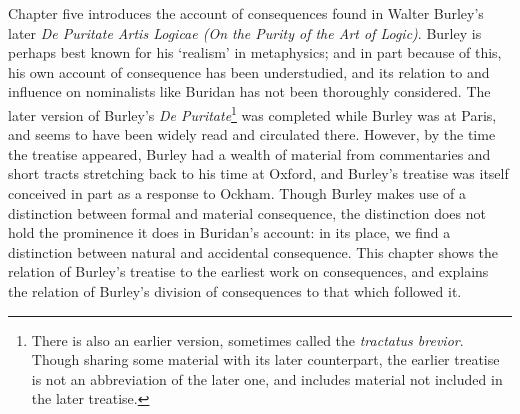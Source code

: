\documentclass[]{article}
\begin{document}
Chapter five introduces the account of consequences found in Walter Burley's later \textit{De Puritate Artis Logicae (On the Purity of the Art of Logic)}. Burley is perhaps best known for his `realism' in metaphysics; and in part because of this, his own account of consequence has been understudied, and its relation to and influence on nominalists like Buridan has not been thoroughly considered. The later version of Burley's \textit{De Puritate}\footnote{There is also an earlier version, sometimes called the \textit{tractatus brevior}. Though sharing some material with its later counterpart, the earlier treatise is not an abbreviation of the later one, and includes material not included in the later treatise.} was completed while Burley was at Paris, and seems to have been widely read and circulated there. However, by the time the treatise appeared, Burley had a wealth of material from commentaries and short tracts stretching back to his time at Oxford, and Burley's treatise was itself conceived in part as a response to Ockham. Though Burley makes use of a distinction between formal and material consequence, the distinction does not hold the prominence it does in Buridan's account: in its place, we find a distinction between natural and accidental consequence. This chapter shows the relation of Burley's treatise to the earliest work on consequences, and explains the relation of Burley's division of consequences to that which followed it.


\end{document}
